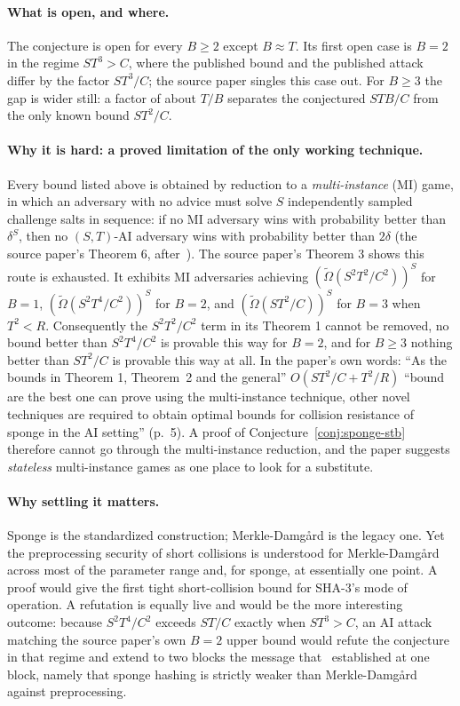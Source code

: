 \documentclass{aicr-conjecture}
\newcommand{\tOm}{\tilde{\Omega}}
\begin{document}
\paragraph{What is open, and where.}
The conjecture is open for every $B \ge 2$ except $B \approx T$. Its
first open case is $B = 2$ in the regime $ST^{3} > C$, where the
published bound and the published attack differ by the factor
$ST^{3}/C$; the source paper singles this case out. For $B \ge 3$ the
gap is wider still: a factor of about $T/B$ separates the conjectured
$STB/C$ from the only known bound $ST^{2}/C$.

\paragraph{Why it is hard: a proved limitation of the only working
  technique.}
Every bound listed above is obtained by reduction to a
\emph{multi-instance} (MI) game, in which an adversary with no advice
must solve $S$ independently sampled challenge salts in sequence: if no
MI adversary wins with probability better than $\delta^{S}$, then no
$(S,T)$-AI adversary wins with probability better than $2\delta$ (the
source paper's Theorem 6, after~\cite{AGL22}). The source paper's
Theorem 3 shows this route is exhausted. It exhibits MI adversaries
achieving $(\tOm(S^{2}T^{2}/C^{2}))^{S}$ for $B = 1$,
$(\tOm(S^{2}T^{4}/C^{2}))^{S}$ for $B = 2$, and
$(\tOm(ST^{2}/C))^{S}$ for $B = 3$ when $T^{2} < R$. Consequently the
$S^{2}T^{2}/C^{2}$ term in its Theorem 1 cannot be removed, no bound
better than $S^{2}T^{4}/C^{2}$ is provable this way for $B = 2$, and
for $B \ge 3$ nothing better than $ST^{2}/C$ is provable this way at
all. In the paper's own words: ``As the bounds in Theorem 1,
Theorem~2 and the general'' $O(ST^{2}/C + T^{2}/R)$ ``bound are the
best one can prove using the multi-instance technique, other novel
techniques are required to obtain optimal bounds for collision
resistance of sponge in the AI setting'' (p.~5). A proof of
Conjecture~\ref{conj:sponge-stb} therefore cannot go through the
multi-instance reduction, and the paper suggests \emph{stateless}
multi-instance games as one place to look for a substitute.

\paragraph{Why settling it matters.}
Sponge is the standardized construction; Merkle-Damg\aa{}rd is the
legacy one. Yet the preprocessing security of short collisions is
understood for Merkle-Damg\aa{}rd across most of the parameter range
and, for sponge, at essentially one point. A proof would give the
first tight short-collision bound for SHA-3's mode of operation. A
refutation is equally live and would be the more interesting outcome:
because $S^{2}T^{4}/C^{2}$ exceeds $ST/C$ exactly when $ST^{3} > C$,
an AI attack matching the source paper's own $B = 2$ upper bound would
refute the conjecture in that regime and extend to two blocks the
message that~\cite{FGK22} established at one block, namely that sponge
hashing is strictly weaker than Merkle-Damg\aa{}rd against
preprocessing.
\end{document}
